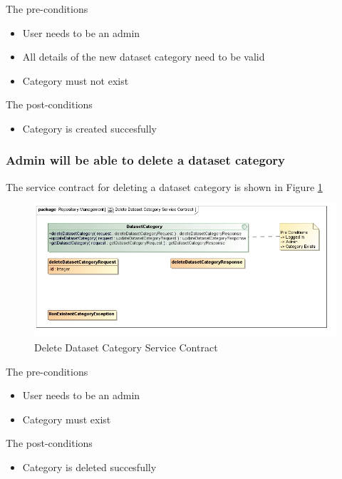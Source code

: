 The pre-conditions
\begin{itemize}
  \item User needs to be an admin
  \item All details of the new dataset category need to be valid
  \item Category must not exist
\end{itemize}

The post-conditions
\begin{itemize}
  \item Category is created succesfully
\end{itemize}

\subsubsection {Admin will be able to delete a dataset category}

The service contract for deleting a dataset category is shown in Figure \ref{fig:deleteDatasetCatService}
\begin{figure}[H]
  \begin{center}
  \includegraphics[scale=0.6]{../Diagrams and Charts/Test Data/Delete Dataset Category Service Contract.jpg}
  \caption{Delete Dataset Category Service Contract}
  \end{center}
  \label{fig:deleteDatasetCatService}
\end{figure}

The pre-conditions
\begin{itemize}
  \item User needs to be an admin
  \item Category must exist
\end{itemize}

The post-conditions
\begin{itemize}
  \item Category is deleted succesfully
\end{itemize}

